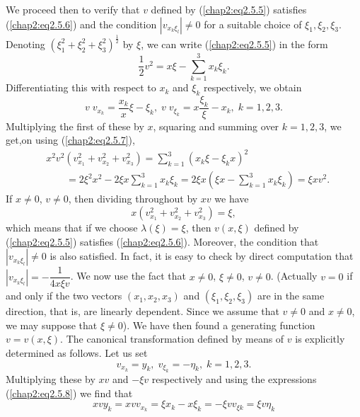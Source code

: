We proceed then to verify that $v$ defined by (\ref{chap2:eq2.5.5}) satisfies (\ref{chap2:eq2.5.6}) and the condition $|v_{x_k \xi_l}| \neq 0$ for a suitable choice of $\xi_1,\xi_2, \xi_3$. Denoting $(\xi^2_1 + \xi^2_2 + \xi^2_3)^{\frac{1}{2}}$ by $\xi$, we can write (\ref{chap2:eq2.5.5}) in the form 
\begin{equation*}
\frac{1}{2} v^2 = x\xi - \sum\limits^3_{k=1} x_k \xi_k. \tag{2.5.7}\label{chap2:eq2.5.7} 
\end{equation*}
Differentiating this with respect to $x_k$ and $\xi_k$ respectively, we obtain
\begin{equation*}
v \; v_{x_k} = \frac{x_k}{x} \xi - \xi_k, \; v \; v_{\xi_k} = x \frac{\xi_k}{\xi} - x_k, \; k = 1,2,3. \tag{2.5.8}\label{chap2:eq2.5.8} 
\end{equation*}
Multiplying the first of these by $x$, squaring and summing over $k=1,2,3$, we get,\pageoriginale on using (\ref{chap2:eq2.5.7}),
\begin{align*}
& x^2 v^2 (v^2_{x_1} + v^2_{x_2} + v^2_{x_3}) = \sum\limits^3_{k=1} (x_k \xi - \xi_k x)^2\\
& \qquad = 2 \xi^2 x^2 - 2 \xi x \sum\limits^3 _{k=1} x_k \xi_k = 2 \xi x(\xi x - \sum\limits^3_{k=1} x_k \xi_k) = \xi x v^2. 
\end{align*}
If $x \neq 0$, $v \neq 0$, then dividing throughout by $xv$ we have
$$
x (v^2_{x_1} + v^2_{x_2} + v^2_{x_3})= \xi,
$$
which means that if we choose $\lambda(\xi) = \xi$, then $v(x,\xi)$ defined by (\ref{chap2:eq2.5.5}) satisfies (\ref{chap2:eq2.5.6}). Moreover, the condition that $|v_{x_k \xi_l}| \neq 0$ is also satisfied. In fact, it is easy to check by direct computation that $|v_{x_k \xi_l}| = - \dfrac{1}{4x \xi v}$. We now use the fact that $x \neq 0$, $\xi \neq 0$, $v \neq 0$. (Actually $v=0$ if and only if the two vectors $(x_1, x_2, x_3)$ and $(\xi_1, \xi_2, \xi_3)$ are in the same direction, that is, are linearly dependent. Since we assume that $v \neq 0$ and $x \neq 0$, we may suppose that $\xi \neq 0$). We have then found a generating function $v = v(x, \xi)$. The canonical transformation defined by means of $v$ is explicitly determined as follows. Let us set
\begin{equation*}
v_{x_k} = y_k, \; v_{\xi_k} = - \eta_k, \; k =1,2,3. \tag{2.5.9}\label{chap2:eq2.5.9} 
\end{equation*}
Multiplying these by $xv$ and $-\xi v$ respectively and using the expressions (\ref{chap2:eq2.5.8}) we find that 
\begin{equation*}
xvy_k = xvv_{x_k} = \xi x_k - x \xi_k = - \xi v v_{\xi k} = \xi v \eta_k \tag{2.5.10} \label{chap2:eq2.5.10} 
\end{equation*}
